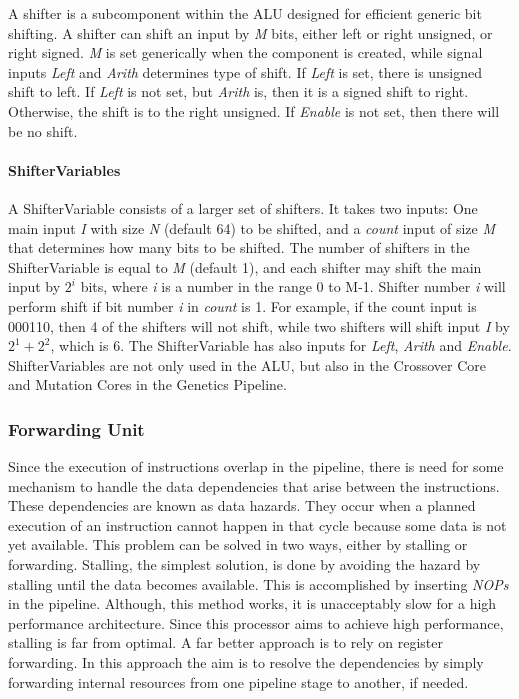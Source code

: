 A shifter is a subcomponent within the ALU designed for efficient generic bit shifting.
A shifter can shift an input by \emph{M} bits, either left or right unsigned, or right signed. \emph{M} is set generically when the component is created, while signal inputs  \emph{Left} and \emph{Arith} determines type of shift. 
If \emph{Left} is set, there is unsigned shift to left.
If \emph{Left} is not set, but \emph{Arith} is, then it is a signed shift to right.
Otherwise, the shift is to the right unsigned.
If \emph{Enable} is not set, then there will be no shift.

\paragraph{ShifterVariables}
A ShifterVariable consists of a larger set of shifters. 
It takes two inputs: One main input \emph{I} with size \emph{N} (default 64) to be shifted, and a \emph{count} input of size \emph{M} that determines how many bits to be shifted. 
The number of shifters in the ShifterVariable is equal to \emph{M} (default 1), and each shifter may shift the main input by $2^i$ bits, where \emph{i} is a number in the range 0 to M-1. 
Shifter number \emph{i} will perform shift if bit number \emph{i} in \emph{count} is 1. 
For example, if the count input is 000110, then 4 of the shifters will not shift, while two shifters will shift input \emph{I} by $2^1 + 2^2$, which is 6.
The ShifterVariable has also inputs for \emph{Left}, \emph{Arith} and \emph{Enable}.
ShifterVariables are not only used in the ALU, but also in the Crossover Core and Mutation Cores in the Genetics Pipeline.



\newpage
\subsubsection{Forwarding Unit} \label{fpga:fitness:sss:forwarding_unit}
Since the execution of instructions overlap in the pipeline, there is need for some mechanism to handle the data dependencies that arise between the instructions.
These dependencies are known as data hazards.
They occur when a planned execution of an instruction cannot happen in that cycle because some data is not yet available.
This problem can be solved in two ways, either by stalling or forwarding.
Stalling, the simplest solution, is done by avoiding the hazard by stalling until the data becomes available.
This is accomplished by inserting \emph{NOPs} in the pipeline.
Although, this method works, it is unacceptably slow for a high performance architecture.
Since this processor aims to achieve high performance, stalling is far from optimal.
A far better approach is to rely on register forwarding.
In this approach the aim is to resolve the dependencies by simply forwarding internal resources from one pipeline stage to another, if needed.

